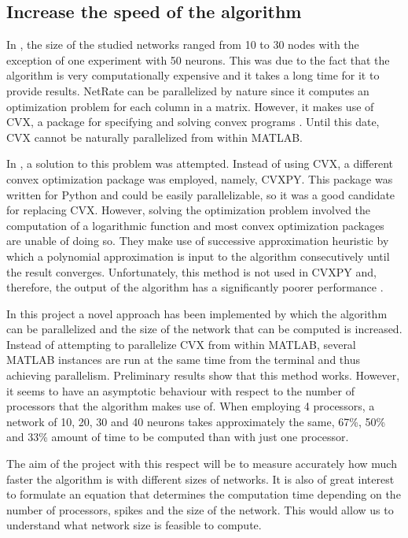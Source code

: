 \documentclass[11pt]{article}
\begin{document}
\subsection{Increase the speed of the algorithm}

In \cite{alexandru2018estimating}, the size of the studied networks ranged from 10 to 30 nodes with the exception of one experiment with 50 neurons. This was due to the fact that the algorithm is very computationally expensive and it takes a long time for it to provide results. NetRate can be parallelized by nature since it computes an optimization problem for each column in a matrix. However, it makes use of CVX, a package for specifying and solving convex programs \cite{cvx,gb08}. Until this date, CVX cannot be naturally parallelized from within MATLAB. 

In \cite{alexandru2018estimating}, a solution to this problem was attempted. Instead of using CVX, a different convex optimization package was employed, namely, CVXPY. This package was written for Python and could be easily parallelizable, so it was a good candidate for replacing CVX. However, solving the optimization problem involved the computation of a logarithmic function and most convex optimization packages are unable of doing so. They make use of successive approximation heuristic by which a polynomial approximation is input to the algorithm consecutively until the result converges. Unfortunately, this method is not used in CVXPY and, therefore, the output of the algorithm has a significantly poorer performance \cite{pranav_report}. 

In this project a novel approach has been implemented by which the algorithm can be parallelized and the size of the network that can be computed is increased. Instead of attempting to parallelize CVX from within MATLAB, several MATLAB instances are run at the same time from the terminal and thus achieving parallelism. Preliminary results show that this method works. However, it seems to have an asymptotic behaviour with respect to the number of processors that the algorithm makes use of. When employing 4 processors, a network of 10, 20, 30 and 40 neurons takes approximately the same, 67\%, 50\% and 33\% amount of time to be computed than with just one processor. 

The aim of the project with this respect will be to measure accurately how much faster the algorithm is with different sizes of networks. It is also of great interest to formulate an equation that determines the computation time depending on the number of processors, spikes and the size of the network. This would allow us to understand what network size is feasible to compute.
\end{document}
